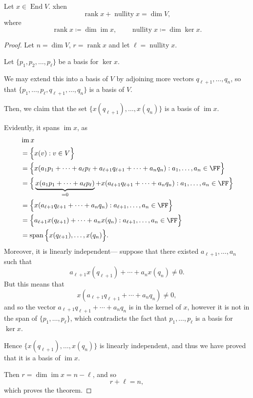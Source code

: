 \documentclass{article}
\DeclareMathOperator{\End}{End}
\DeclareMathOperator{\im}{im}
\DeclareMathOperator{\rank}{rank}
\DeclareMathOperator{\nullity}{nullity}
\DeclareMathOperator{\opspan}{span}
\begin{document}
\begin{theorem}
    \label{thm:RankNullity}
    Let $x \in \End V$.
    xhen
    \[
        \rank x + \nullity x
        =
        \dim V,
    \]
    where
    \[
        \rank x
        \coloneq
        \dim \im x
        ,\qquad
        \nullity x
        \coloneq
        \dim \ker x.
    \]
\end{theorem}

\begin{proof}
    Let $n = \dim V$, $r = \rank x$ and let $\ell = \nullity x$.

    Let $\{p_1,p_2,\ldots,p_\ell\}$ be a basis for $\ker x$.

    We may extend this into a basis of $V$ by adjoining more vectors $q_{\ell+1},\ldots,q_n$, so that $\{p_1,\ldots,p_\ell,q_{\ell+1},\ldots,q_n\}$ is a basis of $V$.

    Then, we claim that the set $\{x(q_{\ell+1}), \ldots, x(q_n)\}$ is a basis of $\im x$.

    Evidently, it spans $\im x$, as
    \begin{align*}
        &\im x
        \\
        &=
        \Big\{
            x(v): v \in V
        \Big\}
        \\
        &=
        \Big\{
            x(a_1p_1 + \cdots + a_\ell p_\ell + a_{\ell+1} q_{\ell+1} + \cdots + a_n q_n)
            :  
            a_1,\ldots,a_n \in \FF
        \Big\}
        \\
        &=
        \Big\{
            \underbrace{
                x(a_1p_1 + \cdots + a_\ell p_\ell)
            }_{=0}
            + x(a_{\ell+1} q_{\ell+1} + \cdots + a_n q_n)
            :  
            a_1,\ldots,a_n \in \FF
        \Big\}
        \\
        &=
        \Big\{
            x(a_{\ell+1} q_{\ell+1} + \cdots + a_n q_n)
            :  
            a_{\ell+1},\ldots,a_n \in \FF
        \Big\}
        \\
        &=
        \Big\{
            a_{\ell+1} x(q_{\ell+1}) + \cdots + a_n x(q_n)
            :  
            a_{\ell+1},\ldots,a_n \in \FF
        \Big\}
        \\
        &=
        \opspan\Big\{x(q_{\ell+1}), \ldots, x(q_n)\Big\}.
    \end{align*}
    Moreover, it is linearly independent--- suppose that there existed $a_{\ell+1}, \ldots, a_n$ such that
    \[
        a_{\ell+1} x(q_{\ell+1}) + \cdots + a_n x(q_n)
        \neq
        0.
    \]
    But this means that
    \[
        x(a_{\ell+1}q_{\ell+1} + \cdots + a_n q_n)
        \neq
        0,
    \]
    and so the vector $a_{\ell+1} q_{\ell+1} + \cdots + a_n q_n$ is in the kernel of $x$, however it is not in the span of $\{p_1,\ldots,p_\ell\}$, which contradicts the fact that $p_1,\ldots,p_\ell$ is a basis for $\ker x$.

    Hence $\{x(q_{\ell+1}), \ldots, x(q_n)\}$ is linearly independent, and thus we have proved that it is a basis of $\im x$.

    Then $r = \dim \im x = n - \ell$, and so
    \[
        r + \ell 
        = 
        n,
    \]
    which proves the theorem.
\end{proof}
\end{document}
